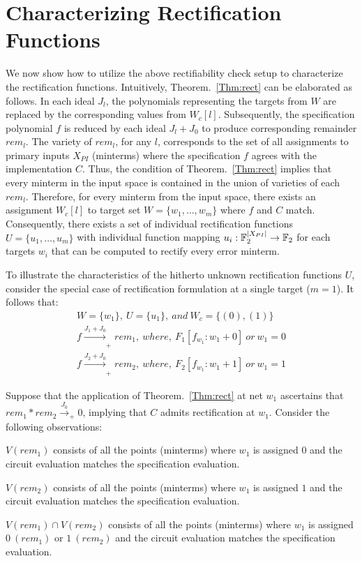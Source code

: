 \section{Characterizing Rectification Functions}

We now show how to utilize the above rectifiability check setup to 
characterize the rectification functions.  
Intuitively, Theorem.~\ref{Thm:rect} can be elaborated as follows.
In each ideal $J_l$, the polynomials representing the targets from
$W$ are replaced by the corresponding values from $W_c[l]$. 
Subsequently, the specification polynomial $f$ is reduced by 
each ideal $J_l+J_0$ to produce corresponding remainder $rem_l$. 
The variety of $rem_l$, for any $l$, corresponds to the set of
all assignments to primary inputs $X_{PI}$ (minterms) where the
specification $f$ agrees with the implementation $C$. Thus, the
condition of Theorem.~\ref{Thm:rect} implies that every minterm in the 
input space is contained in the union of varieties of each $rem_l$. 
Therefore, for every minterm from the input space, there exists an assignment
$W_c[l]$ to target set $W = \{w_1,\dots,w_m\}$ where $f$ and $C$ match. Consequently, there
exists a set of individual rectification functions $U=\{u_1,\dots,u_m\}$ with individual function 
mapping $u_i:{\mathbb{F}}_{2}^{|X_{PI}|}\rightarrow {\mathbb{F}}_{2}$ for each targets $w_i$ that 
can be computed to rectify every error minterm. 

To illustrate the characteristics of the hitherto unknown rectification functions $U$,
consider the special case of rectification formulation at a single target ($m=1$).
It follows that:  
\begin{align*}
W=\{w_1\},~U=\{u_1\},~and~W_c = \{(0),(1)\}\\
f \xrightarrow[]{J_1 + J_{0}}_+rem_1,~where,~F_1[f_{w_1}: w_1 + 0]~or~w_1=0\\
f \xrightarrow[]{J_2 + J_{0}}_+rem_2,~where,~F_2[f_{w_1}: w_1 + 1]~or~w_1=1
\end{align*}

Suppose that the application of Theorem.~\ref{Thm:rect} at net $w_1$ ascertains
that $rem_1*rem_2\xrightarrow{J_0}_+0$, implying that $C$ admits rectification 
at $w_1$. 
Consider the following observations:

\bi
\item $V(rem_1)$ consists of all the points (minterms) where $w_1$ is assigned $0$ and the circuit evaluation matches
the specification evaluation.
\item $V(rem_2)$ consists of all the points (minterms) where $w_1$ is assigned $1$ and the circuit evaluation matches
the specification evaluation.
\item $V(rem_1) \cap V(rem_2)$ consists of all the points (minterms) where $w_1$ is assigned $0~(rem_1)$ or $1~(rem_2)$ and the circuit evaluation matches the specification evaluation.
\ei

